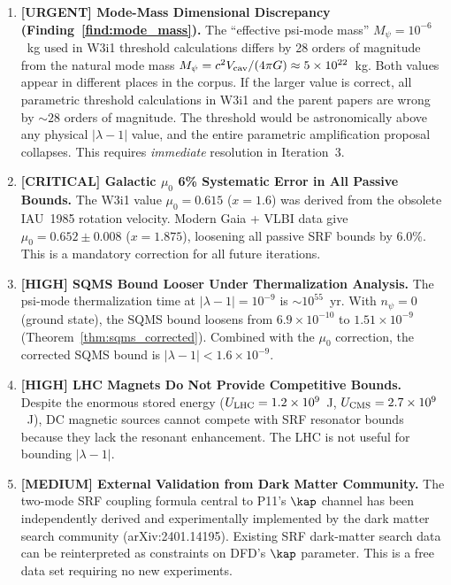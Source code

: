 \documentclass[11pt,twocolumn]{article}
\newcommand{\lam}{\lambda}
\newcommand{\Mpsi}{M_\psi}
\begin{document}
\begin{enumerate}

\item \textbf{[URGENT] Mode-Mass Dimensional Discrepancy (Finding~\ref{find:mode_mass}).}
The ``effective psi-mode mass'' $\Mpsi = 10^{-6}$~kg used in W3i1 threshold
calculations differs by 28 orders of magnitude from the natural mode mass
$\Mpsi = c^2 V_{\rm cav}/(4\pi G) \approx 5\times10^{22}$~kg. Both values
appear in different places in the corpus. If the larger value is correct,
all parametric threshold calculations in W3i1 and the parent papers are
wrong by $\sim 28$ orders of magnitude. The threshold would be astronomically
above any physical $|\lam-1|$ value, and the entire parametric amplification
proposal collapses. This requires \emph{immediate} resolution in Iteration~3.

\item \textbf{[CRITICAL] Galactic $\mu_0$ 6\% Systematic Error in All Passive Bounds.}
The W3i1 value $\mu_0 = 0.615$ ($x = 1.6$) was derived from the obsolete
IAU~1985 rotation velocity. Modern Gaia + VLBI data give $\mu_0 = 0.652\pm0.008$
($x = 1.875$), loosening all passive SRF bounds by 6.0\%. This is a mandatory
correction for all future iterations.

\item \textbf{[HIGH] SQMS Bound Looser Under Thermalization Analysis.}
The psi-mode thermalization time at $|\lam-1| = 10^{-9}$ is $\sim 10^{55}$~yr.
With $n_\psi = 0$ (ground state), the SQMS bound loosens from $6.9\times10^{-10}$
to $1.51\times10^{-9}$ (Theorem~\ref{thm:sqms_corrected}). Combined with the
$\mu_0$ correction, the corrected SQMS bound is $|\lam-1| < 1.6\times10^{-9}$.

\item \textbf{[HIGH] LHC Magnets Do Not Provide Competitive Bounds.}
Despite the enormous stored energy ($U_{\rm LHC} = 1.2\times10^9$~J,
$U_{\rm CMS} = 2.7\times10^9$~J), DC magnetic sources cannot compete with
SRF resonator bounds because they lack the resonant enhancement. The LHC
is not useful for bounding $|\lam-1|$.

\item \textbf{[MEDIUM] External Validation from Dark Matter Community.}
The two-mode SRF coupling formula central to P11's $\kap$ channel has been
independently derived and experimentally implemented by the dark matter search
community (arXiv:2401.14195). Existing SRF dark-matter search data can be
reinterpreted as constraints on DFD's $\kap$ parameter. This is a free data
set requiring no new experiments.

\end{enumerate}
\end{document}

